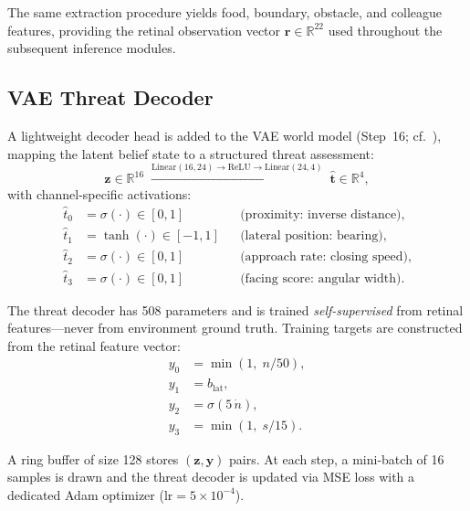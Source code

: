 \documentclass[11pt,a4paper]{article}
\begin{document}
The same extraction procedure yields food, boundary, obstacle, and colleague
features, providing the retinal observation vector
$\mathbf{r} \in \mathbb{R}^{22}$ used throughout the subsequent inference
modules.

\subsection{VAE Threat Decoder}\label{sec:threat_decoder}

A lightweight decoder head is added to the VAE world model
(Step~16; cf.~\cite{kingma2014,hafner2020}),
mapping the latent belief state to a structured threat assessment:
\begin{equation}\label{eq:threat_decoder}
  \mathbf{z} \in \mathbb{R}^{16}
  \;\xrightarrow{\text{Linear}(16,24) \to \text{ReLU} \to \text{Linear}(24,4)}\;
  \hat{\mathbf{t}} \in \mathbb{R}^4,
\end{equation}
with channel-specific activations:
\begin{equation}\label{eq:threat_channels}
\boxed{
\begin{aligned}
  \hat{t}_0 &= \sigma(\cdot) \in [0,1] & &\text{(proximity: inverse distance)}, \\
  \hat{t}_1 &= \tanh(\cdot) \in [-1,1] & &\text{(lateral position: bearing)}, \\
  \hat{t}_2 &= \sigma(\cdot) \in [0,1] & &\text{(approach rate: closing speed)}, \\
  \hat{t}_3 &= \sigma(\cdot) \in [0,1] & &\text{(facing score: angular width)}.
\end{aligned}
}
\end{equation}

The threat decoder has 508 parameters and is trained
\emph{self-supervised} from retinal features---never from environment
ground truth.
Training targets are constructed from the retinal feature vector:
\begin{equation}\label{eq:threat_targets}
\begin{aligned}
  y_0 &= \min(1,\; n / 50), \\
  y_1 &= b_\text{lat}, \\
  y_2 &= \sigma(5\,\dot{n}), \\
  y_3 &= \min(1,\; s / 15).
\end{aligned}
\end{equation}

A ring buffer of size 128 stores $(\mathbf{z}, \mathbf{y})$ pairs.
At each step, a mini-batch of 16 samples is drawn and the threat decoder
is updated via MSE loss with a dedicated Adam optimizer
($\text{lr} = 5 \times 10^{-4}$).
\end{document}
